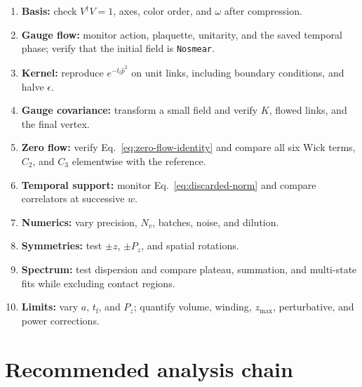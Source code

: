 \documentclass[11pt]{article}
\numberwithin{equation}{section}
\newcommand{\tf}{t_{\mathrm f}}
\begin{document}
\begin{enumerate}
  \item \textbf{Basis:} check \(V^\dagger V=1\), axes, color order, and
        \(\omega\) after compression.
  \item \textbf{Gauge flow:} monitor action, plaquette, unitarity, and the
        saved temporal phase; verify that the initial field is
        \texttt{Nosmear}.
  \item \textbf{Kernel:} reproduce \(e^{-\tf\widehat p^2}\) on unit links,
        including boundary conditions, and halve \(\epsilon\).
  \item \textbf{Gauge covariance:} transform a small field and verify \(K\),
        flowed links, and the final vertex.
  \item \textbf{Zero flow:} verify Eq.~\eqref{eq:zero-flow-identity} and compare
        all six Wick terms, \(C_2\), and \(C_3\) elementwise with the reference.
  \item \textbf{Temporal support:} monitor Eq.~\eqref{eq:discarded-norm} and
        compare correlators at successive \(w\).
  \item \textbf{Numerics:} vary precision, \(N_v\), batches, noise, and
        dilution.
  \item \textbf{Symmetries:} test \(\pm z\), \(\pm P_z\), and spatial
        rotations.
  \item \textbf{Spectrum:} test dispersion and compare plateau, summation,
        and multi-state fits while excluding contact regions.
  \item \textbf{Limits:} vary \(a\), \(\tf\), and \(P_z\); quantify volume,
        winding, \(z_{\max}\), perturbative, and power corrections.
\end{enumerate}

\section{Recommended analysis chain}
\end{document}
